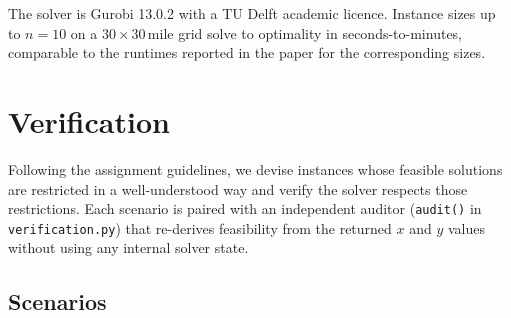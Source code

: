 \documentclass[11pt,a4paper]{article}
\begin{document}
The solver is Gurobi 13.0.2 with a TU Delft academic licence. Instance
sizes up to $n{=}10$ on a $30{\times}30$\,mile grid solve to optimality in
seconds-to-minutes, comparable to the runtimes reported in the paper for
the corresponding sizes.

\section{Verification}
\label{sec:verification}

Following the assignment guidelines, we devise instances whose feasible
solutions are restricted in a well-understood way and verify the solver
respects those restrictions. Each scenario is paired with an independent
auditor (\texttt{audit()} in \texttt{verification.py}) that re-derives
feasibility from the returned $x$ and $y$ values without using any
internal solver state.

\subsection{Scenarios}
\end{document}
